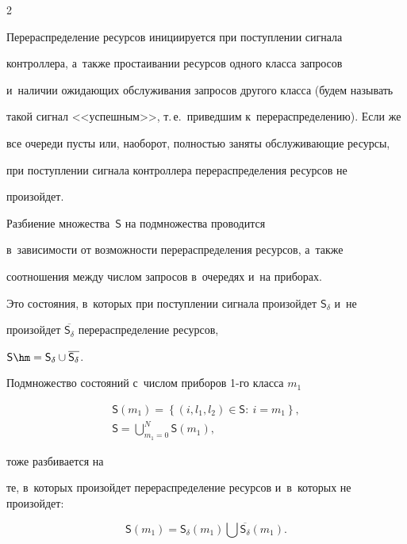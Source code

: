\begin{multicols}{2}
    


  Перераспределение ресурсов инициируется при поступлении сигнала 


контроллера, а~также простаивании ресурсов одного класса запросов 


и~наличии ожидающих обслуживания запросов другого класса (будем называть 


такой сигнал <<успешным>>, т.\,е.\ приведшим к~перераспределению). Если же 


все очереди пусты или, наоборот, полностью заняты обслуживающие ресурсы, 


при поступлении сигнала контроллера перераспределения ресурсов не 


произойдет.


  


  Разбиение множества~$\mathsf{S}$ на подмножества проводится 


в~зависимости от возможности перераспределения ресурсов, а~также 


соотношения между числом запросов в~очередях и~на приборах. 


Это состояния, в~которых при поступлении сигнала произойдет $\mathsf{S}_\delta$ и~не 


произойдет $\overline{\mathsf{S}_\delta}$ перераспределение ресурсов, 


$\mathsf{S}\hm= \mathsf{S}_\delta \cup \overline{\mathsf{S}_\delta}$. 


Подмножество со\-сто\-яний с~числом приборов 1-го класса $m_1$


\begin{gather*}


\mathsf{S}(m_1)= \left\{ (i,l_1,l_2)\in \mathsf{S}:\ i=m_1\right\}, \\


\mathsf{S}= \mathop{\bigcup}\limits_{m_1=0}^N \mathsf{S}\left(m_1\right),


\end{gather*}


 тоже разбивается на 


те, в~которых произойдет перераспределение ресурсов и~в~которых не произойдет: 


  $$


  \mathsf{S}(m_1)= \mathsf{S}_\delta (m_1)\bigcup 


\overline{\mathsf{S}_\delta}\left(m_1\right).


$$


%



\end{multicols}
